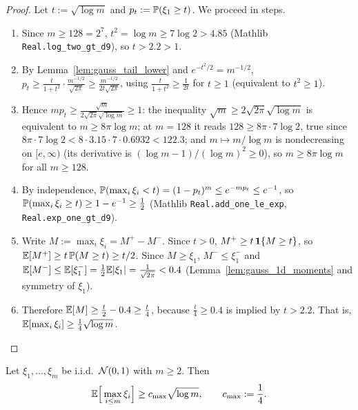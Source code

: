 \begin{proof}
\leanok
{}
Let $t := \sqrt{\log m}$ and $p_t := \mathbb{P}(\xi_1\ge t)$. We proceed in steps.
\begin{enumerate}
  \item[(i)] Since $m\ge128 = 2^7$, $t^2 = \log m \ge 7\log 2 > 4.85$ (Mathlib
        \texttt{Real.log\_two\_gt\_d9}), so $t > 2.2 > 1$.
  \item[(ii)] By Lemma~\ref{lem:gauss_tail_lower} and $e^{-t^2/2} = m^{-1/2}$,
        $p_t \ge \frac{t}{1+t^2}\cdot\frac{m^{-1/2}}{\sqrt{2\pi}} \ge \frac{m^{-1/2}}{2t\sqrt{2\pi}}$,
        using $\frac{t}{1+t^2}\ge\frac{1}{2t}$ for $t\ge1$ (equivalent to $t^2\ge1$).
  \item[(iii)] Hence $mp_t \ge \frac{\sqrt m}{2\sqrt{2\pi}\sqrt{\log m}} \ge 1$: the inequality
        $\sqrt m \ge 2\sqrt{2\pi}\sqrt{\log m}$ is equivalent to $m \ge 8\pi\log m$; at
        $m = 128$ it reads $128\ge 8\pi\cdot7\log2$, true since $8\pi\cdot7\log 2 < 8\cdot3.15\cdot7\cdot0.6932 < 122.3$;
        and $m\mapsto m/\log m$ is nondecreasing on $[e,\infty)$ (its derivative is
        $(\log m - 1)/(\log m)^2\ge0$), so $m\ge 8\pi\log m$ for all $m\ge128$.
  \item[(iv)] By independence, $\mathbb{P}(\max_i\xi_i < t) = (1-p_t)^m \le e^{-mp_t} \le e^{-1}$,
        so $\mathbb{P}(\max_i\xi_i\ge t) \ge 1 - e^{-1} \ge \frac12$ (Mathlib
        \texttt{Real.add\_one\_le\_exp}, \texttt{Real.exp\_one\_gt\_d9}).
  \item[(v)] Write $M := \max_i\xi_i = M^+ - M^-$. Since $t > 0$, $M^+ \ge t\,\mathbf{1}\{M\ge t\}$, so
        $\mathbb{E}[M^+] \ge t\,\mathbb{P}(M\ge t) \ge t/2$. Since $M\ge\xi_1$, $M^- \le \xi_1^-$ and
        $\mathbb{E}[M^-]\le\mathbb{E}[\xi_1^-] = \frac12\mathbb{E}\lvert \xi_1 \rvert = \frac{1}{\sqrt{2\pi}} < 0.4$
        (Lemma~\ref{lem:gauss_1d_moments} and symmetry of $\xi_1$).
  \item[(vi)] Therefore $\mathbb{E}[M] \ge \frac t2 - 0.4 \ge \frac t4$, because $\frac t4 \ge 0.4$ is
        implied by $t > 2.2$. That is, $\mathbb{E}[\max_i\xi_i]\ge\frac14\sqrt{\log m}$.
\end{enumerate}
\end{proof}

\begin{lemma}\label{lem:gauss_max_lower}
\leanok
{}
Let $\xi_1,\dots,\xi_m$ be i.i.d.\ $\mathcal{N}(0,1)$ with $m\ge2$. Then
\[
  \mathbb{E}\Big[\max_{i\le m}\xi_i\Big] \ge c_{\max}\sqrt{\log m},\qquad c_{\max} := \frac14 .
\]
\end{lemma}

